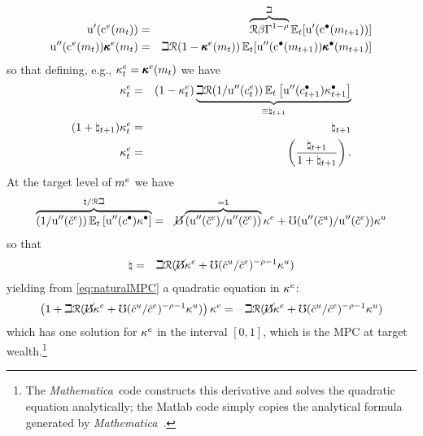 \message{ !name(TractableBufferStock.tex)}\documentclass{handout}
\begin{document}
\begin{eqnarray}
  {\ensuremath{\mathrm{u}^{\prime}}}(\mathrm{c}^{e}(m_{t})) & = & \overbrace{\mathcal{R} \beta \Gamma^{1-\rho}}^{\beth} \operatorname{\mathbb{E}}_{t}[{\mathrm{u}^{\prime}}(\mathrm{c}^{\bullet}(m_{t+1}))]
\\  {\mathrm{u}}^{\prime\prime}(\mathrm{c}^{e}(m_{t}))\pmb{\kappa}^{e}(m_{t}) & = & \beth  \mathcal{R} (1-\pmb{\kappa}^{e}(m_{t}))\operatorname{\mathbb{E}}_{t}[{\mathrm{u}}^{\prime\prime}(\mathrm{c}^{\bullet}(m_{t+1}))\pmb{\kappa}^{\bullet}(m_{t+1})] \label{eq:dEuler}
\end{eqnarray}
so that defining, e.g., $\kappa^{e}_{t} = \pmb{\kappa}^{e}(m_{t})$ we have 
\begin{eqnarray}
 \kappa^{e}_{t} & = &  (1-\kappa^{e}_{t}) \underbrace{\beth \mathcal{R} (1/{\mathrm{u}^{\prime\prime}}(c^{e}_{t}))\operatorname{\mathbb{E}}_{t}\left[{\mathrm{u}^{\prime\prime}}(c^{\bullet}_{t+1})\kappa^{\bullet}_{t+1}\right]}_{\equiv \natural_{t+1}} \label{eq:natural}
\\ (1+\natural_{t+1})\kappa^{e}_{t} & = & \natural_{t+1} \label{eq:naturalMPC}
\\ \kappa^{e}_{t} & = & \left(\frac{\natural_{t+1}}{1+\natural_{t+1}}\right) \label{eq:naturalSolved}
.
\end{eqnarray}
\newcommand{\Mma}{{\it Mathematica}~}
At the target level of $m^{e}$ we have 
\begin{eqnarray*}
  \overbrace{(1/{\mathrm{u}^{\prime\prime}}(\check{c}^{e}))\operatorname{\mathbb{E}}_{t}\left[{\mathrm{u}^{\prime\prime}}(c^{\bullet})\kappa^{\bullet}\right]}^{\natural / \mathcal{R} \beth} & = & \cancel{\mho} \overbrace{({\mathrm{u}^{\prime\prime}}(\check{c}^{e})/{\mathrm{u}^{\prime\prime}}(\check{c}^{e}))}^{=1}\kappa^{e}+\mho ({\mathrm{u}^{\prime\prime}}(\check{c}^{u})/{\mathrm{u}^{\prime\prime}}(\check{c}^{e}))\kappa^{u}
\end{eqnarray*}
so that 
\begin{eqnarray}
  \natural & = &  \beth \mathcal{R} (\cancel{\mho} \kappa^{e} + \mho (\check{c}^{u}/\check{c}^{e})^{-\rho-1} \kappa^{u})
\end{eqnarray}
yielding from \eqref{eq:naturalMPC} a quadratic equation in $\kappa^{e}$:
\begin{eqnarray}
  \left(1+\beth \mathcal{R} (\cancel{\mho} \kappa^{e} + \mho (\check{c}^{u}/\check{c}^{e})^{-\rho-1}  \kappa^{u}) \right)\kappa^{e} & = & \beth \mathcal{R} (\cancel{\mho} \kappa^{e} + \mho (\check{c}^{u}/\check{c}^{e})^{-\rho-1} \kappa^{u}) \label{eq:quadraticForTargetMPC}
\end{eqnarray} 
which has one solution for $\kappa^{e}$ in the interval $[0,1]$, which is the MPC at target wealth.\footnote{The 
\Mma code constructs this derivative and solves the quadratic equation analytically; the Matlab code simply copies
the analytical formula generated by \Mma.}
\end{document}
